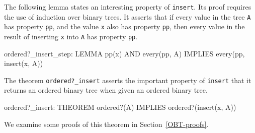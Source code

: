 \documentclass[11pt,twoside]{book}
\begin{document}
The following lemma states an interesting property of \texttt{insert}\@.
 Its proof requires the use of induction over binary trees. 
It asserts that if every value in the tree \texttt{A} has property \texttt{pp},
and the value \texttt{x} also has property \texttt{pp}, then every value in
the result of inserting \texttt{x} into \texttt{A} has property \texttt{pp}\@.
\begin{session*}\label{oistep}
ordered?_insert_step: LEMMA
   pp(x) AND every(pp, A) IMPLIES every(pp, insert(x, A))
\end{session*}

The  theorem \texttt{ordered?\_insert}  asserts the important
property of \texttt{insert} that it returns an ordered binary tree when
given an ordered binary tree.
\begin{session*}\label{ordered?_insert}
ordered?_insert: THEOREM
   ordered?(A) IMPLIES ordered?(insert(x, A))
\end{session*}

We examine some proofs of this theorem in  Section~\ref{OBT-proofs}.  
\end{document}
